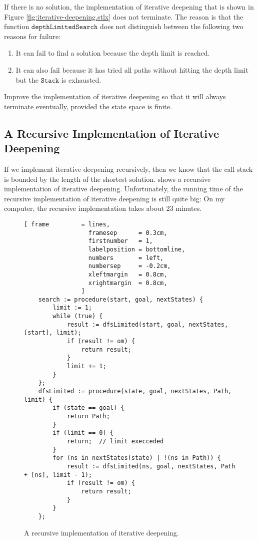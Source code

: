\exercise 
If there is no solution, the implementation of iterative deepening that is shown in Figure
\ref{fig:iterative-deepening.stlx} does not terminate.  The reason is that the function $\mathtt{depthLimitedSearch}$ does not
distinguish between the following two reasons for failure:
\begin{enumerate}
\item It can fail to find a solution because the depth limit is reached.
\item It can also fail because it has tried all paths without hitting the depth limit but the $\mathtt{Stack}$ is exhausted.  
\end{enumerate}
Improve the implementation of iterative deepening so that it will always terminate eventually, provided the
state space is finite. 
\eoxs

\subsection{A Recursive Implementation of Iterative Deepening}
If we implement iterative deepening recursively, then we know that the call stack is bounded by the length of
the shortest solution.    
shows a recursive implementation of iterative deepening. 
Unfortunately, the running time of the recursive implementation of iterative deepening is still
quite big:  On my computer, the recursive implementation takes about 23 minutes.


\begin{figure}[!ht]
\centering
\begin{Verbatim}[ frame         = lines, 
                  framesep      = 0.3cm, 
                  firstnumber   = 1,
                  labelposition = bottomline,
                  numbers       = left,
                  numbersep     = -0.2cm,
                  xleftmargin   = 0.8cm,
                  xrightmargin  = 0.8cm,
                ]
    search := procedure(start, goal, nextStates) {
        limit := 1;  
        while (true) {
            result := dfsLimited(start, goal, nextStates, [start], limit);
            if (result != om) {
                return result;
            }
            limit += 1;
        }
    };
    dfsLimited := procedure(state, goal, nextStates, Path, limit) {
        if (state == goal) {
            return Path;
        }
        if (limit == 0) {
            return;  // limit execceded
        }
        for (ns in nextStates(state) | !(ns in Path)) {
            result := dfsLimited(ns, goal, nextStates, Path + [ns], limit - 1);
            if (result != om) {
                return result;
            }   
        }
    };
\end{Verbatim}
\vspace*{-0.3cm}
\caption{A recursive implementation of iterative deepening.}
\label{fig:iterative-deepening-recursive.stlx}
\end{figure}

